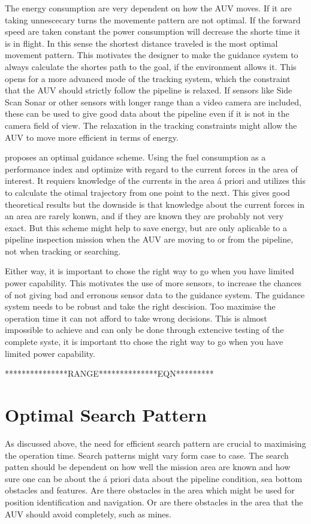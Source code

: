 	The energy consumption are very dependent on how the AUV moves. If it are taking unnescecary turns the
	movemente pattern are not optimal. If the forward speed are taken constant the power consumption will
	decrease the shorte time it is in flight. In this sense the shortest distance traveled is the most optimal
	movement pattern. This motivates the designer to make the guidance system to always calculate the shortes 
	path to the goal, if the environment allows it. This opens for a more advanced mode of the tracking
	system, which the constraint that the AUV should strictly follow the pipeline is relaxed. If sensors
	like Side Scan Sonar or other sensors with longer range than a video camera are included, these can 
	be used to give good data about the pipeline even if it
	is not in the camera field of view. The relaxation in the tracking constraints might allow the AUV to
	move more efficient in terms of energy.
	
	\cite{fuel_optimal_control} proposes an optimal guidance scheme. Using the
	fuel consumption as a performance index and optimize with regard to the current forces in the area of
	interest. It requiers knowledge of the currents in the area \'a priori and utilizes this to calculate
	the otimal trajectory from one point to the next. This gives good theoretical results but the downside
	is that knowledge about the current forces in an area are rarely konwn, and if they are known they are
	probably not very exact. But this scheme might help to save energy, but are only aplicable to a
	pipeline inspection mission when the AUV are moving to or from the pipeline, not when tracking or
	searching.
	
	Either way, it is important to chose the right way to go when you have limited power capability. This
	motivates the use of more sensors, to increase the chances of not giving bad and erronous sensor data
	to the guidance system. The guidance system needs to be robust and take the right descision. Too
	maximise the operation time it can not afford to take wrong decisions. This is almost impossible to
	achieve and can only be done through extencive testing of the complete syste, it is important tto
	chose the right way to go when you have limited power capability.

	***************RANGE**************EQN*********

\section{Optimal Search Pattern}
	As discussed above, the need for efficient search pattern are crucial to maximising the operation
	time. Search patterns might vary form case to case. The search patten should be dependent on how well
	the mission area are known and how sure one can be about the \'a priori data about the pipeline
	condition, sea bottom obstacles and features. Are there obstacles in the area which might be used for
	position identification and navigation. Or are there obstacles in the area that the AUV should avoid
	completely, such as mines. 

